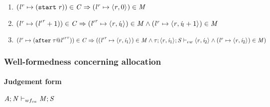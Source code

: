 \begin{enumerate}
    \item \label{wfconstr:constraint-start} $ ({\mathit{l}}^{\mathit{r}} \mapsto (\texttt{start}\; \mathit{r})) \in \mathit{C} \Rightarrow \\
            ({\mathit{l}}^{\mathit{r}} \mapsto \langle \mathit{r}, 0 \rangle ^{}) \in \mathit{M} $

    \item \label{wfconstr:constraint-tag} $ ({\mathit{l}}^{\mathit{r}} \mapsto ({\mathit{l}'}^{\mathit{r}} + 1)) \in \mathit{C} \Rightarrow
            \\
            ({\mathit{l}'}^{\mathit{r}} \mapsto \langle \mathit{r}, \mathit{i}_l \rangle ^{})  \in \mathit{M} \wedge \\
            ({\mathit{l}}^{\mathit{r}} \mapsto \langle \mathit{r}, \mathit{i}_l + 1 \rangle ^{})  \in \mathit{M}
            $

    \item \label{wfconstr:constraint-after} $ ({\mathit{l}}^{\mathit{r}} \mapsto (\texttt{after}\; \mathit{\tau} @ {{\mathit{l}'}^{\mathit{r}}}^{\mathit{r}})) \in \mathit{C} \Rightarrow \\
            (({\mathit{l}'}^{\mathit{r}} \mapsto \langle \mathit{r}, \mathit{i}_1 \rangle ^{}) \in \mathit{M} \wedge \\
            \mathit{\tau};\langle \mathit{r}, \mathit{i}_1 \rangle ^{};\mathit{S} \vdash_{ew} \langle \mathit{r}, \mathit{i}_2 \rangle ^{} \wedge \\
            ({\mathit{l}}^{\mathit{r}} \mapsto \langle \mathit{r}, \mathit{i}_2 \rangle ^{}) \in \mathit{M})
            $

\end{enumerate}


\subsubsection{Well-formedness concerning allocation}
\label{sec:well-formedness-allocation}

\paragraph{Judgement form}

$\mathit{A};\mathit{N} \vdash_{wf_{ca}} \mathit{M};\mathit{S}$

